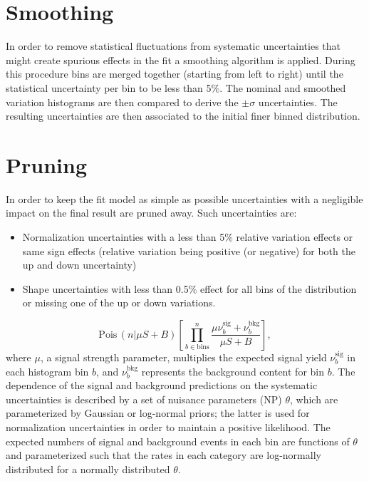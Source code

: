 
\section{Smoothing}
In order to remove statistical fluctuations from systematic uncertainties that might create spurious effects in the fit a smoothing algorithm is applied. During this procedure bins are merged together (starting from left to right) until the statistical uncertainty per bin to be less than 5$\%$. The nominal and smoothed variation histograms are then compared to derive the $\pm\sigma$ uncertainties. The resulting uncertainties are then associated to the initial finer binned distribution. %

\section{Pruning}
In order to keep the fit model as simple as possible uncertainties with a negligible impact on the final result are pruned away. Such uncertainties are:
  \begin{itemize}
   \item  Normalization uncertainties with a less than 5$\%$ relative variation effects or same sign effects (relative variation being positive (or negative) for both the up and down uncertainty)
   \item  Shape uncertainties with less than 0.5$\%$ effect for all bins of the distribution or missing one of the up or down variations.
    \end{itemize}

\begin{equation}     \mathrm{Pois}\,(n|\mu S+B)\left[ \prod_{b\in \text{bins}}^{n} \frac{\mu \nu^{\mathrm{sig}}_{b}+\nu^{\mathrm{bkg}}_{b}}{\mu S+B} \right],
\end{equation} where $\mu$,
a signal strength parameter, multiplies the expected signal yield $\nu^{\mathrm{sig}}_b$ in each histogram bin $b$, and $\nu^{\mathrm{bkg}}_b$ represents the background content for bin $b$.
The dependence of the signal and background predictions on the systematic uncertainties is described by a set of nuisance parameters (NP) $\theta$, which are parameterized by Gaussian or log-normal priors; the latter is used for normalization uncertainties in order to maintain a positive likelihood.
The expected numbers of signal and background events in each bin are functions of $\theta$ and parameterized such that the rates in each category are log-normally distributed for a normally distributed $\theta$.

